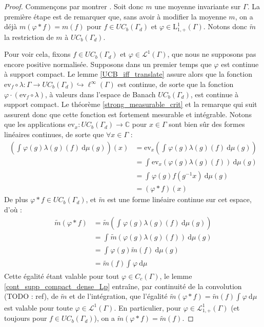 \documentclass[a4paper,12pt]{article}
\newcommand{\C}{\mathbb{C}}
\newcommand{\ev}{\mathrm{ev}}
\newcommand{\integral}[4]{\int_{#1}^{#2} #3~\mathrm{d}#4}
\newcommand{\inv}{^{-1}}
\newcommand{\comp}{\circ}
\renewcommand{\implies}{\Rightarrow}
\newcommand{\TODO}[1]{{\color{red}TODO :} #1}
\begin{document}
\begin{proof}
    Commençons par montrer \framebox{$(\ref{amenable_TFAE/amenable})\implies(\ref{amenable_TFAE/topological_mean})$}. Soit donc 
    $m$ une moyenne invariante sur $\Gamma$. La première étape est de remarquer que, sans avoir à modifier la moyenne 
    $m$, on a déjà $m(\varphi\ast f) = m(f)$ pour $f\in UC_b(\Gamma_d)$ et $\varphi\in\mathrm{L}^1_{1, +}(\Gamma)$.
    Notons donc $\widetilde{m}$ la restriction de $m$ à $UC_b(\Gamma_d)$.

    Pour voir cela, fixons $f\in UC_b(\Gamma_d)$ et $\varphi\in\mathscr{L}^1(\Gamma)$, que nous ne supposons pas encore positive normalisée.
    Supposons dans un premier temps que $\varphi$ est continue à support compact. Le lemme \ref{UCB_iff_translate} assure 
    alors que la fonction $\ev_f\comp\lambda:\Gamma\to UC_b(\Gamma_d)\hookrightarrow\ell^\infty(\Gamma)$ est continue,
    de sorte que la fonction $\varphi\cdot(\ev_f\comp\lambda)$, à valeurs dans l'espace de Banach $UC_b(\Gamma_d)$, est continue à support compact.
    Le théorème \ref{strong_measurable_crit} et la remarque qui suit assurent donc que cette fonction est fortement mesurable et intégrable.
    Notons que les applications $\ev_x:UC_b(\Gamma_d)\to\C$ pour $x\in\Gamma$ sont bien sûr des formes linéaires continues, de sorte que $\forall x\in\Gamma$ :
    \begin{align*}
        \left(\integral{}{}{\varphi(g)\lambda(g)(f)}{\mu(g)}\right)(x) 
            &= \ev_x\left(\integral{}{}{\varphi(g)\lambda(g)(f)}{\mu(g)}\right) \\
            &= \integral{}{}{\ev_x(\varphi(g)\lambda(g)(f))}{\mu(g)} \\
            &= \integral{}{}{\varphi(g)f(g\inv x)}{\mu(g)} \\
            &= (\varphi\ast f)(x)
    \end{align*}
    De plus $\varphi\ast f\in UC_b(\Gamma_d)$, et $\widetilde{m}$ est une forme linéaire continue sur cet espace, d'où :
    \begin{align*}
        \widetilde{m}(\varphi\ast f) 
            &= \widetilde{m}\left(\integral{}{}{\varphi(g)\lambda(g)(f)}{\mu(g)}\right) \\
            &= \integral{}{}{\widetilde{m}(\varphi(g)\lambda(g)(f))}{\mu(g)} \\
            &= \integral{}{}{\varphi(g)\widetilde{m}(f)}{\mu(g)} \\
            &= \widetilde{m}(f)\integral{}{}{\varphi}{\mu}
    \end{align*}
    Cette égalité étant valable pour tout $\varphi\in C_c(\Gamma)$, le lemme \ref{cont_supp_compact_dense_Lp} entraîne, par continuité de la convolution (\TODO{ref}), 
    de $\widetilde{m}$ et de l'intégration, que l'égalité $\widetilde{m}(\varphi\ast f) = \widetilde{m}(f)\integral{}{}{\varphi}{\mu}$ est valable 
    pour toute $\varphi\in\mathscr{L}^1(\Gamma)$. En particulier, pour $\varphi\in\mathscr{L}^1_{1, +}(\Gamma)$ (et toujours pour 
    $f\in UC_b(\Gamma_d)$), on a $\widetilde{m}(\varphi\ast f) = \widetilde{m}(f)$.
    

\end{proof}
\end{document}
